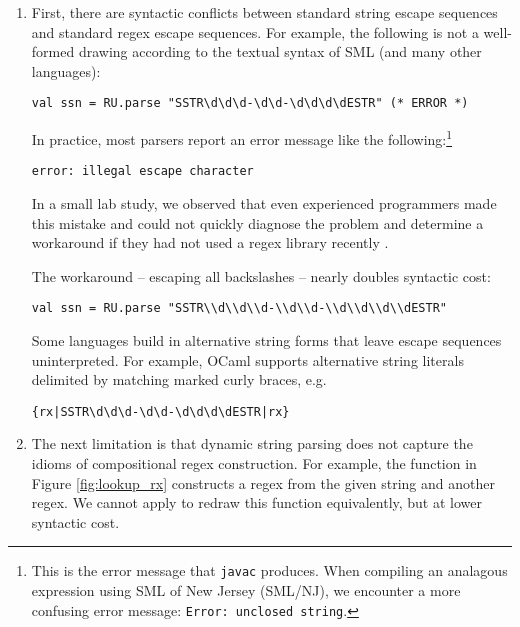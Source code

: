 \begin{enumerate} 
\item First, there are syntactic conflicts between standard string escape sequences and standard regex escape sequences. For example, the following is not a well-formed drawing according to the textual syntax of SML (and many other languages):
\begin{lstlisting}[numbers=none,mathescape=|]
val ssn = RU.parse "SSTR\d\d\d-\d\d-\d\d\d\dESTR" (* ERROR *)
\end{lstlisting}
In practice, most parsers report an error message like the following:\footnote{This is the error message that \texttt{javac} produces. When compiling an analagous expression using SML of New Jersey (SML/NJ), we encounter a more confusing error message: \texttt{Error: unclosed string}.}
\begin{lstlisting}[numbers=none]
error: illegal escape character
\end{lstlisting}
In a small lab study, we observed that even experienced programmers made this mistake and could not quickly diagnose the problem and determine a workaround if they had not used a regex library recently  \cite{Omar:2012:ACC:2337223.2337324}.

The workaround -- escaping all backslashes -- nearly doubles syntactic cost:
\begin{lstlisting}[numbers=none]
val ssn = RU.parse "SSTR\\d\\d\\d-\\d\\d-\\d\\d\\d\\dESTR"
\end{lstlisting}

Some languages build in alternative string forms that leave escape sequences uninterpreted. For example, OCaml supports alternative string literals delimited by matching marked curly braces, e.g. 
\begin{lstlisting}[numbers=none]
{rx|SSTR\d\d\d-\d\d-\d\d\d\dESTR|rx}
\end{lstlisting}
\item The next limitation is that dynamic string parsing does not capture  the idioms of compositional regex construction. 
For example, the function  in Figure \ref{fig:lookup_rx} constructs a regex from the given string and another regex. We cannot apply  to redraw this function equivalently, but at lower syntactic cost. 


\end{enumerate}
